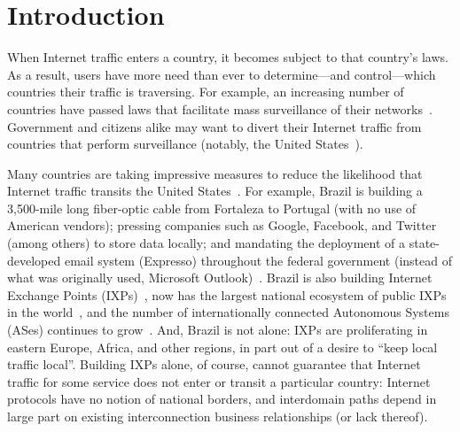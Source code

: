 \section{Introduction}
\label{intro}

When Internet traffic enters a country, it becomes subject to that
country's laws.  As a result, users have more need than ever to
determine---and control---which countries their traffic is traversing.
For example, an increasing number of countries have passed laws that
facilitate mass surveillance of their
networks~\cite{france_surveillance, netherlands_surveillance,
  kazak_surveillance, uk_bill}. Government and citizens alike may want
to divert their Internet traffic from countries that perform
surveillance (notably, the United States~\cite{russia_secure_internet,
  routing_errors, dte}).

Many countries are taking impressive measures to reduce the likelihood
that Internet traffic transits the United States~\cite{brazil_history,
  brazil_break_from_US, brazil_conference, brazil_conference2,
  brazil_human_rights}.  For example, Brazil is building a 3,500-mile
long fiber-optic cable from Fortaleza to Portugal (with no use of
American vendors); pressing companies such as Google, Facebook, and
Twitter (among others) to store data locally; and mandating the
deployment of a state-developed email system (Expresso) throughout the
federal government (instead of what was originally used, Microsoft
Outlook)~\cite{brazil_cable, brazil_us_companies}.  Brazil is also
building Internet Exchange Points (IXPs)~\cite{brazil_IXP1}, now has the
largest national ecosystem of public IXPs in the
world~\cite{brazil_ixp_ecosystem}, and the number of internationally
connected Autonomous Systems (ASes) continues to
grow~\cite{brazil_international_ases}. And, Brazil is not alone: IXPs
are proliferating in eastern Europe, Africa, and other regions, in part
out of a desire to ``keep local traffic local''. Building IXPs alone, of
course, cannot guarantee that Internet traffic for some service does not
enter or transit a particular country: Internet protocols have no notion
of national borders, and interdomain paths depend in large part on
existing interconnection business relationships (or lack thereof).

